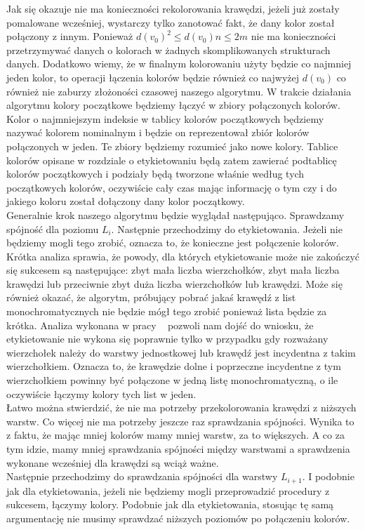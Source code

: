 \documentclass[12pt,a4paper,titlepage]{article}
\begin{document}
Jak się okazuje nie ma konieczności rekolorowania krawędzi, jeżeli już zostały pomalowane wcześniej, wystarczy tylko zanotować fakt, że dany kolor został połączony z innym. Ponieważ $d(v_0)^2 \leqslant d(v_0)n \leqslant 2m $ nie ma konieczności przetrzymywać danych o kolorach w żadnych skomplikowanych strukturach danych. Dodatkowo wiemy, że w finalnym kolorowaniu użyty będzie co najmniej jeden kolor, to operacji łączenia kolorów będzie również co najwyżej $d(v_0)$ co również nie zaburzy złożoności czasowej naszego algorytmu. W trakcie działania algorytmu kolory początkowe będziemy łączyć w zbiory połączonych kolorów. Kolor o najmniejszym indeksie w tablicy kolorów początkowych będziemy nazywać kolorem nominalnym i będzie on reprezentował zbiór kolorów połączonych w jeden. Te zbiory będziemy rozumieć jako nowe kolory. Tablice kolorów opisane w rozdziale o etykietowaniu będą zatem zawierać podtablicę kolorów początkowych i podziały będą tworzone właśnie według tych początkowych kolorów, oczywiście cały czas mając informację o tym czy i do jakiego koloru został dołączony dany kolor początkowy.\\
Generalnie krok naszego algorytmu będzie wyglądał następująco. Sprawdzamy spójność dla poziomu $L_i$. Następnie przechodzimy do etykietowania. Jeżeli nie będziemy mogli tego zrobić, oznacza to, że konieczne jest połączenie kolorów. Krótka analiza sprawia, że powody, dla których etykietowanie może nie zakończyć się sukcesem są następujące: zbyt mała liczba wierzchołków, zbyt mała liczba krawędzi lub przeciwnie zbyt duża liczba wierzchołków lub krawędzi. Może się również okazać, że algorytm, próbujący pobrać jakaś krawędź z list monochromatycznych nie będzie mógł tego zrobić ponieważ lista będzie za krótka. Analiza wykonana w pracy ~\cite{IMR} pozwoli nam dojść do wniosku, że etykietowanie nie wykona się poprawnie tylko w przypadku gdy rozważany wierzchołek należy do warstwy jednostkowej lub krawędź jest incydentna z takim wierzchołkiem. Oznacza to, że krawędzie dolne i poprzeczne incydentne z tym wierzchołkiem powinny być połączone w jedną listę monochromatyczną, o ile oczywiście łączymy kolory tych list w jeden. \\
Łatwo można stwierdzić, że nie ma potrzeby przekolorowania krawędzi z niższych warstw. Co więcej nie ma potrzeby jeszcze raz sprawdzania spójności. Wynika to z faktu, że mając mniej kolorów mamy mniej warstw, za to większych. A co za tym idzie, mamy mniej sprawdzania spójności między warstwami a sprawdzenia wykonane wcześniej dla krawędzi są wciąż ważne. \\
Następnie przechodzimy do sprawdzania spójności dla warstwy $L_{i+1}$. I podobnie jak dla etykietowania, jeżeli nie będziemy mogli przeprowadzić procedury z sukcesem, łączymy kolory. Podobnie jak dla etykietowania, stosując tę samą argumentację nie musimy sprawdzać niższych poziomów po połączeniu kolorów.\\ 
\end{document}
